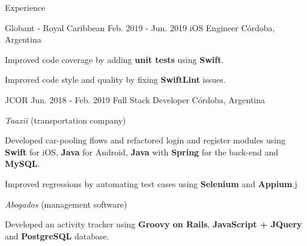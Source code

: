 \documentclass{curriculum}
\begin{document}
\begin{cvsection}{Experience}
\begin{sectionitemlist}
        \end{sectionitemlist}


    \makesectionitemheader
        {Globant - Royal Caribbean}                         {Feb. 2019 - Jun. 2019}
        {iOS Engineer}                                         {Córdoba, Argentina}

        \begin{sectionitemlist}
        \item{Improved code coverage by adding \textbf{unit tests} using \textbf{Swift}.}
        \item{Improved code style and quality by fixing \textbf{SwiftLint} issues.}
        \end{sectionitemlist}


    \makesectionitemheader
        {JCOR}                                              {Jun. 2018 - Feb. 2019}
        {Full Stack Developer}                                 {Córdoba, Argentina}

        \begin{sectionitemlist}

        \item{\textit{Taaxii} (transportation company)}
            \begin{sectionitemlist}
            \item{
                Developed car-pooling flows and refactored login and register
                modules using \textbf{Swift} for iOS, \textbf{Java} for Android,
                \textbf{Java} with \textbf{Spring} for the back-end and \textbf{MySQL}.
            }
            \item{
                Improved regressions by automating test cases
                using \textbf{Selenium} and \textbf{Appium}.j
            }
            \end{sectionitemlist}

        \item{\textit{Abogados} (management software)}
            \begin{sectionitemlist}
            \item{
                Developed an activity tracker using
                \textbf{Groovy on Rails}, \textbf{JavaScript + JQuery}
                and \textbf{PostgreSQL} database.
            }
            \end{sectionitemlist}

        \end{sectionitemlist}

\end{cvsection}
\end{document}
